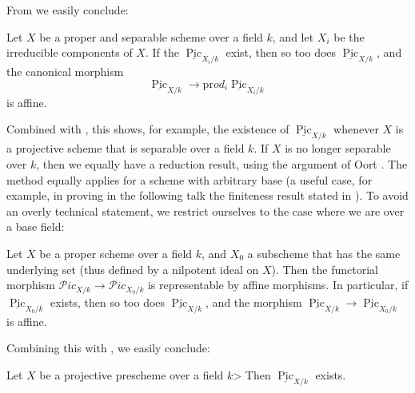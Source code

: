 From  we easily conclude:

\begin{corollary}\label{fga3.v-6-corollary-6.4}
    Let $X$ be a proper and separable scheme over a field $k$, and let $X_i$ be the irreducible components of $X$.
    If the $\underline{\operatorname{Pic}}_{X_i/k}$ exist, then so too does $\underline{\operatorname{Pic}}_{X/k}$, and the canonical morphism
    \[
        \underline{\operatorname{Pic}}_{X/k} \to \mathrm{pr}od_i \underline{\operatorname{Pic}}_{X_i/k}
    \]
    is affine.
\end{corollary}


Combined with , this shows, for example, the existence of $\underline{\operatorname{Pic}}_{X/k}$ whenever $X$ is a projective scheme that is separable over a field $k$.
If $X$ is no longer separable over $k$, then we equally have a reduction result, using the argument of Oort \cite{Oor1962}.
The method equally applies for a scheme with arbitrary base (a useful case, for example, in proving in the following talk the finiteness result stated in ).
To avoid an overly technical statement, we restrict ourselves to the case where we are over a base field:


\begin{proposition}\label{fga3.v-6-proposition-6.5}
    Let $X$ be a proper scheme over a field $k$, and $X_0$ a subscheme that has the same underlying set (thus defined by a nilpotent ideal on $X$).
    Then the functorial morphism $\mathcal{P}ic_{X/k}\to\mathcal{P}ic_{X_0/k}$ is representable by affine morphisms.
    In particular, if $\underline{\operatorname{Pic}}_{X_0/k}$ exists, then so too does $\underline{\operatorname{Pic}}_{X/k}$, and the morphism $\underline{\operatorname{Pic}}_{X/k}\to\underline{\operatorname{Pic}}_{X_0/k}$ is affine.
\end{proposition}


Combining this with , we easily conclude:


\begin{corollary}\label{fga3.v-6-corollary-6.6}
    Let $X$ be a projective prescheme over a field $k$>
    Then $\underline{\operatorname{Pic}}_{X/k}$ exists.
\end{corollary}

